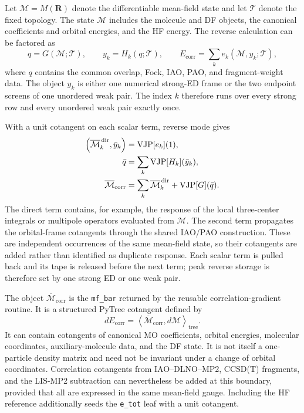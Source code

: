 \documentclass[11pt]{article}
\begin{document}
Let $\mathcal M=M(\mathbf R)$ denote the differentiable mean-field state and
let $\mathcal T$ denote the fixed topology.  The state $\mathcal M$ includes
the molecule and DF objects, the canonical coefficients and orbital energies,
and the HF energy.  The reverse calculation can be factored as
\begin{equation}
 q=G(\mathcal M;\mathcal T),\qquad
 y_k=H_k(q;\mathcal T),\qquad
 E_{\mathrm{corr}}=\sum_k e_k(\mathcal M,y_k;\mathcal T),
 \label{eq:mf-cotangent-factorization}
\end{equation}
where $q$ contains the common overlap, Fock, IAO, PAO, and fragment-weight
data.  The object $y_k$ is either one numerical strong-ED frame or the two
endpoint screens of one unordered weak pair.  The index $k$ therefore runs
over every strong row and every unordered weak pair exactly once.

With a unit cotangent on each scalar term, reverse mode gives
\begin{align}
 \left(\overline{\mathcal M}^{\,\mathrm{dir}}_k,\bar y_k\right)
   &=\operatorname{VJP}[e_k](1),\notag\\
 \bar q
   &=\sum_k\operatorname{VJP}[H_k](\bar y_k),\notag\\
 \overline{\mathcal M}_{\mathrm{corr}}
   &=\sum_k\overline{\mathcal M}^{\,\mathrm{dir}}_k
     +\operatorname{VJP}[G](\bar q).
 \label{eq:mf-cotangent-assembly}
\end{align}
The direct term contains, for example, the response of the local three-center
integrals or multipole operators evaluated from $\mathcal M$.  The second
term propagates the orbital-frame cotangents through the shared IAO/PAO
construction.  These are independent occurrences of the same mean-field
state, so their cotangents are added rather than identified as duplicate
response.  Each scalar term is pulled back and its tape is released before
the next term; peak reverse storage is therefore set by one strong ED or one
weak pair.

The object $\overline{\mathcal M}_{\mathrm{corr}}$ is the
\texttt{mf\_bar} returned by the reusable correlation-gradient routine.  It
is a structured PyTree cotangent defined by
\begin{equation}
 dE_{\mathrm{corr}}
 =\left\langle
   \overline{\mathcal M}_{\mathrm{corr}},d\mathcal M
  \right\rangle_{\mathrm{tree}}.
 \label{eq:mf-bar-definition}
\end{equation}
It can contain cotangents of canonical MO coefficients, orbital energies,
molecular coordinates, auxiliary-molecule data, and the DF state.  It is not
itself a one-particle density matrix and need not be invariant under a change
of orbital coordinates.  Correlation cotangents from IAO--DLNO--MP2,
CCSD(T) fragments, and the LIS-MP2 subtraction can nevertheless be added at
this boundary, provided that all are expressed in the same mean-field gauge.
Including the HF reference additionally seeds the \texttt{e\_tot} leaf with
a unit cotangent.
\end{document}
